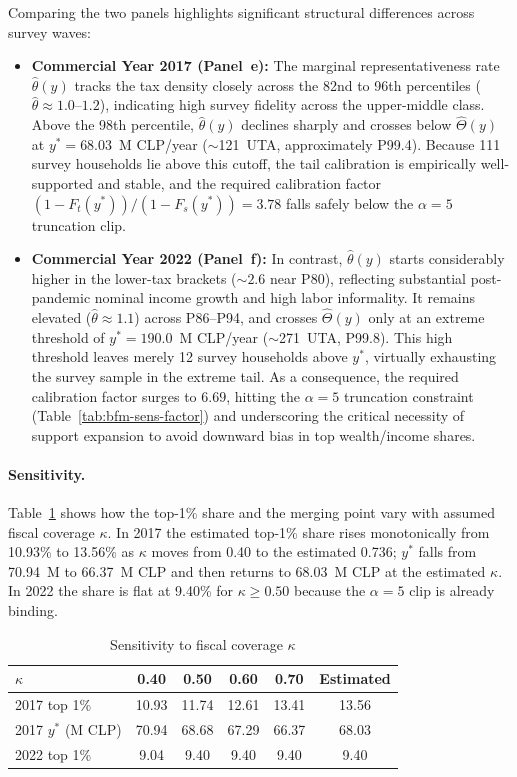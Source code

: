 Comparing the two panels highlights significant structural differences across survey waves:
\begin{itemize}
    \item \textbf{Commercial Year 2017 (Panel~e):} The marginal representativeness rate $\hat{\theta}(y)$ tracks the tax density closely across the 82nd to 96th percentiles ($\hat{\theta} \approx 1.0$--$1.2$), indicating high survey fidelity across the upper-middle class. Above the 98th percentile, $\hat{\theta}(y)$ declines sharply and crosses below $\hat{\Theta}(y)$ at $y^* = 68.03$~M CLP/year ($\sim$121~UTA, approximately P99.4). Because 111 survey households lie above this cutoff, the tail calibration is empirically well-supported and stable, and the required calibration factor $(1 - F_t(y^*))/(1 - F_s(y^*)) = 3.78$ falls safely below the $\alpha = 5$ truncation clip.
    \item \textbf{Commercial Year 2022 (Panel~f):} In contrast, $\hat{\theta}(y)$ starts considerably higher in the lower-tax brackets ($\sim 2.6$ near P80), reflecting substantial post-pandemic nominal income growth and high labor informality. It remains elevated ($\hat{\theta} \approx 1.1$) across P86--P94, and crosses $\hat{\Theta}(y)$ only at an extreme threshold of $y^* = 190.0$~M CLP/year ($\sim$271~UTA, P99.8). This high threshold leaves merely 12 survey households above $y^*$, virtually exhausting the survey sample in the extreme tail. As a consequence, the required calibration factor surges to $6.69$, hitting the $\alpha = 5$ truncation constraint (Table~\ref{tab:bfm-sens-factor}) and underscoring the critical necessity of support expansion to avoid downward bias in top wealth/income shares.
\end{itemize}

\paragraph{Sensitivity.}
Table~\ref{tab:bfm-sens-kappa} shows how the top-1\% share and the merging point vary with assumed fiscal coverage $\kappa$. In 2017 the estimated top-1\% share rises monotonically from 10.93\% to 13.56\% as $\kappa$ moves from 0.40 to the estimated 0.736; $y^{*}$ falls from 70.94~M to 66.37~M CLP and then returns to 68.03~M CLP at the estimated $\kappa$. In 2022 the share is flat at 9.40\% for $\kappa\ge0.50$ because the $\alpha=5$ clip is already binding.

\begin{table}[H]
\centering
\caption{Sensitivity to fiscal coverage $\kappa$}
\label{tab:bfm-sens-kappa}
\small
\begin{tabular}{lccccc}
\toprule
$\kappa$ & 0.40 & 0.50 & 0.60 & 0.70 & Estimated \\
\midrule
2017 top 1\% & 10.93 & 11.74 & 12.61 & 13.41 & 13.56 \\
2017 $y^{*}$ (M CLP) & 70.94 & 68.68 & 67.29 & 66.37 & 68.03 \\
2022 top 1\% & 9.04 & 9.40 & 9.40 & 9.40 & 9.40 \\
\bottomrule
\end{tabular}
\end{table}

